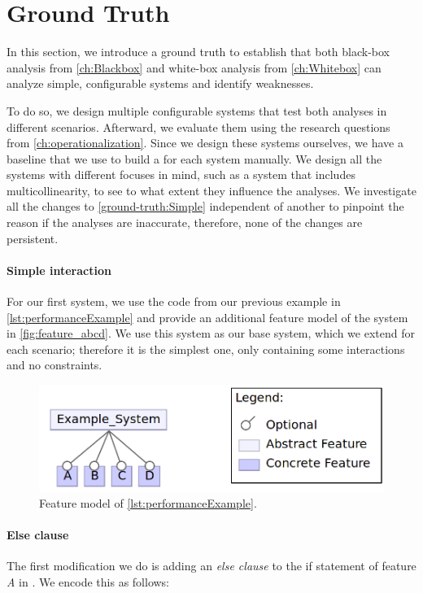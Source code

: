 \section{Ground Truth}\label{sec:ground-truth}
In this section, we introduce a ground truth to establish that both black-box analysis from \autoref{ch:Blackbox} 
and white-box analysis from \autoref{ch:Whitebox} can analyze simple, configurable systems and identify weaknesses. 

To do so, we design multiple configurable systems that test both analyses in different scenarios. 
Afterward, we evaluate them using the research questions from \autoref{ch:operationalization}. 
Since we design these systems ourselves, we have a baseline that we use to build a \perfInfluenceModel for each system manually. 
We design all the systems with different focuses in mind, such as a system that includes multicollinearity, 
to see to what extent they influence the analyses. 
We investigate all the changes to \autoref{ground-truth:Simple} independent of another to pinpoint the reason if the analyses
are inaccurate, therefore, none of the changes are persistent.


\paragraph{Simple interaction}\label{ground-truth:Simple}
For our first system, we use the code from our previous example in \autoref{lst:performanceExample} and provide an additional feature model 
of the system in \autoref{fig:feature_abcd}. 
We use this system as our base system, which we extend for each scenario; therefore it is the simplest one, 
only containing some interactions and no constraints.

\begin{figure}[h]
    \centering
    \includegraphics[scale=0.25]{gfx/Feature_ABCD.png}
    \caption{Feature model of \autoref{lst:performanceExample}.}
    \label{fig:feature_abcd}
\end{figure}


\paragraph{Else clause}
The first modification we do is adding an \emph{else clause} to the if statement of feature \emph{A} in . 
We encode this as follows:

